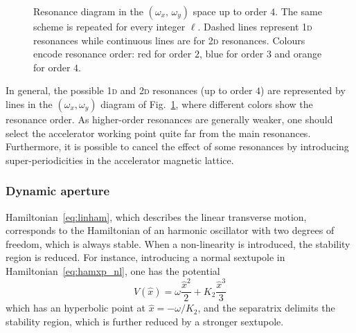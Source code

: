 \begin{figure}
	\centering
	\caption{Resonance diagram in the $(\omega_x,\,\omega_y)$ space up to order $4$. The same scheme is repeated for every integer $\ell$. Dashed lines represent 1\textsc{d} resonances while continuous lines are for 2\textsc{d} resonances. Colours encode resonance order: red for order $2$, blue for order $3$ and orange for order $4$.}
	\label{fig:res}
\end{figure}

In general, the possible 1\textsc{d} and 2\textsc{d} resonances (up to order $4$) are represented by lines in the $(\omega_x, \omega_y)$ diagram of Fig.~\ref{fig:res}, where different colors show the resonance order. As higher-order resonances are generally weaker, one should select the accelerator working point quite far from the main resonances. Furthermore, it is possible to cancel the effect of some resonances by introducing super-periodicities in the accelerator magnetic lattice.

\subsubsection{Dynamic aperture}

Hamiltonian~\eqref{eq:linham}, which describes the linear transverse motion, corresponds to the Hamiltonian of an harmonic oscillator with two degrees of freedom, which is always stable. When a non-linearity is introduced, the stability region  is reduced. For instance, introducing a normal sextupole in Hamiltonian~\eqref{eq:hamxp_nl}, one has the potential
\begin{equation}
	V(\hat x) = \omega \frac{\hat x^2}{2} + K_2\frac{\hat x^3}{3}
\end{equation}
which has an hyperbolic point at $\hat x = -\omega/K_2$, and the separatrix delimits the stability region, which is further reduced by a stronger sextupole.

%

